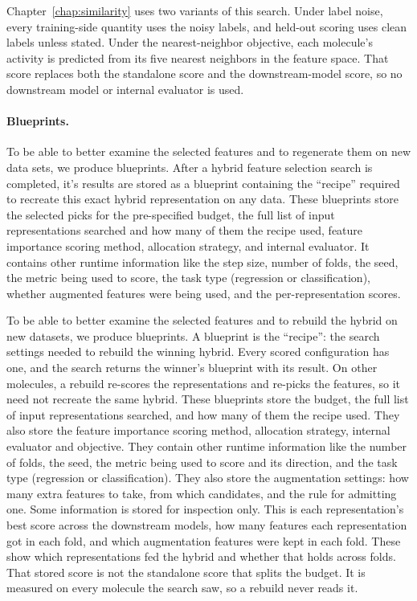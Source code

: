 Chapter~\ref{chap:similarity} uses two variants of this search. Under label noise, every training-side quantity uses the noisy labels, and held-out scoring uses clean labels unless stated. Under the nearest-neighbor objective, each molecule's activity is predicted from its five nearest neighbors in the feature space. That score replaces both the standalone score and the downstream-model score, so no downstream model or internal evaluator is used.



\paragraph{Blueprints.}

To be able to better examine the selected features and to regenerate them on new data sets, we produce blueprints. After a hybrid feature selection search is completed, it's results are stored as a blueprint containing the ``recipe'' required to recreate this exact hybrid representation on any data. These blueprints store the selected picks for the pre-specified budget,  the full list of input representations searched and how many of them the recipe used, feature importance scoring method, allocation strategy, and internal evaluator. It contains other runtime information like the step size, number of folds, the seed, the metric being used to score, the task type (regression or classification), whether augmented features were being used, and the per-representation scores.

To be able to better examine the selected features and to rebuild the hybrid on new datasets, we produce blueprints. A blueprint is the ``recipe'': the search settings needed to rebuild the winning hybrid. Every scored configuration has one, and the search returns the winner's blueprint with its result. On other molecules, a rebuild re-scores the representations and re-picks the features, so it need not recreate the same hybrid. These blueprints store the budget, the full list of input representations searched, and how many of them the recipe used. They also store the feature importance scoring method, allocation strategy, internal evaluator and objective. They contain other runtime information like the number of folds, the seed, the metric being used to score and its direction, and the task type (regression or classification). They also store the augmentation settings: how many extra features to take, from which candidates, and the rule for admitting one. Some information is stored for inspection only. This is each representation's best score across the downstream models, how many features each representation got in each fold, and which augmentation features were kept in each fold. These show which representations fed the hybrid and whether that holds across folds. That stored score is not the standalone score that splits the budget. It is measured on every molecule the search saw, so a rebuild never reads it.

